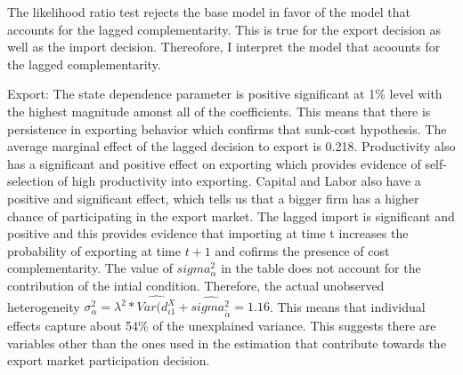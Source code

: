 \documentclass[12pt]{article}
\begin{document}
The likelihood ratio test  rejects the base model in favor of the
model that accounts for the lagged complementarity. This is true for
the export decision as well as the import decision. Thereofore, I interpret the model
that acoounts for the lagged complementarity. 
 

 Export: The state dependence parameter is positive
  significant at 1\% level with the highest magnitude amonst all of
  the coefficients. This means that there is persistence in
  exporting behavior which confirms that sunk-cost hypothesis. The average marginal effect of the lagged
  decision to export is 0.218. Productivity also has a significant and
  positive effect on exporting which provides evidence of
  self-selection of high productivity into exporting. Capital and Labor
  also have a positive and significant effect, which tells us that a
  bigger firm has a higher chance of participating in the export
  market. The lagged import is
  significant and positive and this provides evidence  that importing
  at time t increases the probability of exporting at time $t+1$ and
  cofirms the presence of cost complementarity.  The value of
  $sigma^2_{\alpha}$ in the table does not account for the
  contribution of the intial condition. Therefore, the actual 
  unobserved heterogeneity $\sigma^2_{\alpha}= \lambda^2 *
  \hat{Var(d_{i1}^{X}} + \hat{sigma^2_{\tilde{\alpha}}}= 1.16$. This
  means that individual effects capture  about 54\% of the unexplained
  variance. This suggests there are variables other than the ones used
  in the estimation that contribute towards the export market
  participation decision. 
\end{document}
